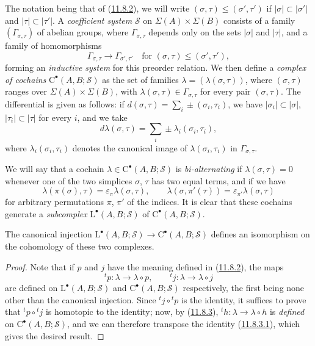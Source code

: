 \begin{env}[11.8.4]
\label{0.11.8.4}
The notation being that of (\hyperref[0.11.8.2]{11.8.2}), we will write
$(\sigma,\tau)\leq(\sigma',\tau')$ if $|\sigma|\subset|\sigma'|$ and
$|\tau|\subset|\tau'|$. A \emph{coefficient system} $\mathscr S$ on
$\Sigma(A)\times\Sigma(B)$ consists of a family
$(\Gamma_{\sigma,\tau})$ of abelian groups, where
$\Gamma_{\sigma,\tau}$ depends only on the sets $|\sigma|$ and $|\tau|$,
and a family of homomorphisms
\[
\Gamma_{\sigma,\tau}\longrightarrow\Gamma_{\sigma',\tau'}
\quad\text{for }(\sigma,\tau)\leq(\sigma',\tau'),
\]
forming an \emph{inductive system} for this preorder relation. We then define
a \emph{complex of cochains} $\mathrm C^\bullet(A,B;\mathscr S)$ as the set
of families $\lambda=(\lambda(\sigma,\tau))$, where $(\sigma,\tau)$ ranges over
$\Sigma(A)\times\Sigma(B)$, with
$\lambda(\sigma,\tau)\in\Gamma_{\sigma,\tau}$ for every pair
$(\sigma,\tau)$. The differential is given as follows: if $d(\sigma,\tau)=\sum_i\pm(\sigma_i,\tau_i)$,
we have $|\sigma_i|\subset|\sigma|$, $|\tau_i|\subset|\tau|$ for every $i$,
and we take
\[
d\lambda(\sigma,\tau)=\sum_i\pm\lambda_i(\sigma_i,\tau_i),
\]
where $\lambda_i(\sigma_i,\tau_i)$ denotes the canonical image of
$\lambda(\sigma_i,\tau_i)$ in $\Gamma_{\sigma,\tau}$.

We will say that a cochain $\lambda\in\mathrm C^\bullet(A,B;\mathscr S)$ is
\emph{bi-alternating} if $\lambda(\sigma,\tau)=0$ whenever one of the two
simplices $\sigma$, $\tau$ has two equal terms, and if we have
\[
\lambda(\pi(\sigma),\tau)=\varepsilon_\pi\lambda(\sigma,\tau),
\qquad
\lambda(\sigma,\pi'(\tau))=\varepsilon_{\pi'}\lambda(\sigma,\tau)
\]
for arbitrary permutations $\pi$, $\pi'$ of the indices. It is clear
that these cochains generate a \emph{subcomplex}
$\mathrm L^\bullet(A,B;\mathscr S)$ of $\mathrm C^\bullet(A,B;\mathscr S)$.
\end{env}

\begin{proposition}[11.8.5]
\label{0.11.8.5}
{The canonical injection $\mathrm L^\bullet(A,B;\mathscr S)\longrightarrow\mathrm C^\bullet(A,B;\mathscr S)$
defines an isomorphism on the cohomology of these two complexes.}
\end{proposition}

\begin{proof}
Note that if $p$ and $j$ have the meaning defined in
(\hyperref[0.11.8.2]{11.8.2}), the maps
\[
{}^tp:\lambda\to\lambda\circ p,\qquad
{}^tj:\lambda\to\lambda\circ j
\]
are defined on $\mathrm L^\bullet(A,B;\mathscr S)$ and
$\mathrm C^\bullet(A,B;\mathscr S)$ respectively, the first being none other
than the canonical injection. Since ${}^tj\circ{}^tp$ is the identity, it
suffices to prove that ${}^tp\circ{}^tj$ is homotopic to the identity;
now, by (\hyperref[0.11.8.3]{11.8.3}),
${}^th:\lambda\to\lambda\circ h$ is \emph{defined} on
$\mathrm C^\bullet(A,B;\mathscr S)$, and we can therefore transpose the identity
(\hyperref[0.11.8.3.1]{11.8.3.1}), which gives the desired result.
\end{proof}

